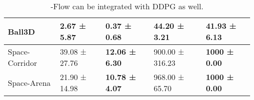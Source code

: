 \begin{table}[tb]
\begin{center}
\begin{tabular}{|l|ll|ll|}
Ball3D                         & \multicolumn{1}{l|}{2.67 ± 5.87}          & \textbf{0.37 ± 0.68}  & \multicolumn{1}{l|}{\textbf{44.20 ± 3.21}}     & 41.93 ± 6.13              \\ \hline
Space-Corridor                 & \multicolumn{1}{l|}{39.08 ± 27.76}        & \textbf{12.06 ± 6.30} & \multicolumn{1}{l|}{900.00 ± 316.23}           & \textbf{1000 ± 0.00}      \\ \hline
Space-Arena                    & \multicolumn{1}{l|}{21.90 ± 14.98}        & \textbf{10.78 ± 4.07} & \multicolumn{1}{l|}{968.00 ± 65.70}            & \textbf{1000 ± 0.00}      \\ \hline
\end{tabular}
\caption{\ourcv-Flow can be integrated with DDPG as well.}
\end{center}
\end{table}

